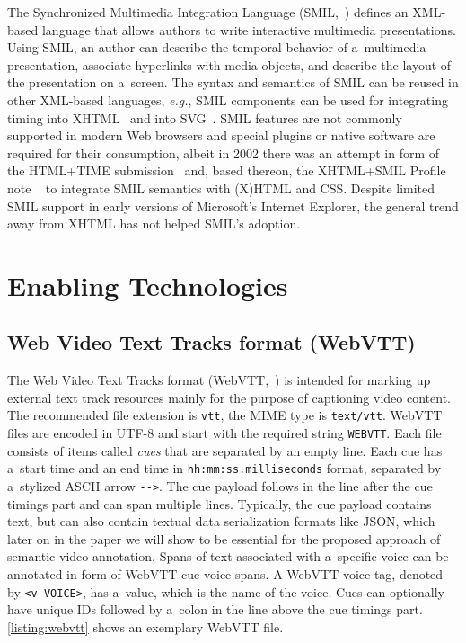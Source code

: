 \documentclass{sig-alternate}
\begin{document}
The Synchronized Multimedia Integration Language\linebreak
(SMIL,~\cite{bulterman2006smil})
defines an XML-based language that allows authors
to write interactive multimedia presentations.
Using SMIL, an author can describe the temporal behavior
of a~multimedia presentation, associate hyperlinks
with media objects, and describe the layout
of the presentation on a~screen.
The syntax and semantics of SMIL can be reused
in other XML-based languages, \emph{e.g.},
SMIL components can be used for integrating timing
into XHTML~\cite{pemberton2002xhtml}
and into SVG~\cite{ferraiolo2003svg}.
SMIL features are not commonly supported 
in modern Web browsers and special plugins or native software
are required for their consumption,
albeit in 2002 there was an attempt
in form of the HTML+TIME submission~\cite{schmitz1998htmltime}
and, based thereon, the XHTML+SMIL Profile note%
~\cite{newman2002xhtmlsmil}
to integrate SMIL semantics with (X)HTML and CSS.
Despite limited SMIL support in early versions of
Microsoft's Internet Explorer,
the general trend away from XHTML
has not helped SMIL's adoption.


\section{Enabling Technologies}

\subsection{Web Video Text Tracks format (WebVTT)}

The Web Video Text Tracks format (WebVTT,~\cite{pfeiffer2013webvtt})
is intended for marking up external text track resources mainly
for the purpose of captioning video content.
The recommended file extension is \texttt{vtt},
the MIME type is \texttt{text/vtt}.
WebVTT files are encoded in UTF-8 and
start with the required string \texttt{WEBVTT}.
Each file consists of items called \emph{cues}
that are separated by an empty line.
Each cue has a~start time and an end time in
\texttt{hh:mm:ss.milliseconds} format,
separated by a~stylized ASCII arrow \texttt{-}\texttt{->}.
The cue payload follows in the line after the cue timings part
and can span multiple lines.
Typically, the cue payload contains text,
but can also contain textual data serialization formats like JSON,
which later on in the paper we will show to be essential
for the proposed approach of semantic video annotation.
Spans of text associated with a~specific voice can be annotated
in form of WebVTT cue voice spans.
A WebVTT voice tag, denoted by \texttt{<v VOICE>}, has a~value,
which is the name of the voice.
Cues can optionally have unique IDs
followed by a~colon in the line
above the cue timings part.
\autoref{listing:webvtt} shows an exemplary WebVTT file.
\end{document}
